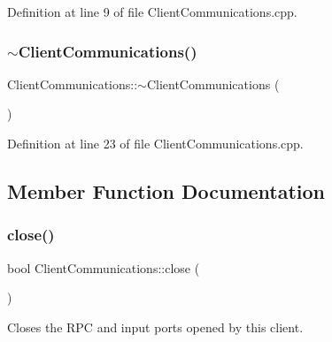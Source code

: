 Definition at line 9 of file Client\+Communications.\+cpp.

\hypertarget{classocra__recipes_1_1ClientCommunications_a20df5cf496f895e9235ad38730962360}{}\label{classocra__recipes_1_1ClientCommunications_a20df5cf496f895e9235ad38730962360} 
\subsubsection{\texorpdfstring{$\sim$\+Client\+Communications()}{~ClientCommunications()}}
{\footnotesize\ttfamily Client\+Communications\+::$\sim$\+Client\+Communications (\begin{DoxyParamCaption}{ }\end{DoxyParamCaption})\hspace{0.3cm}{\ttfamily [virtual]}}



Definition at line 23 of file Client\+Communications.\+cpp.



\subsection{Member Function Documentation}
\hypertarget{classocra__recipes_1_1ClientCommunications_a1ac6b0ebabc5fabdb2bf006ddc48c606}{}\label{classocra__recipes_1_1ClientCommunications_a1ac6b0ebabc5fabdb2bf006ddc48c606} 
\subsubsection{\texorpdfstring{close()}{close()}\hspace{0.1cm}{\footnotesize\ttfamily [1/2]}}
{\footnotesize\ttfamily bool Client\+Communications\+::close (\begin{DoxyParamCaption}{ }\end{DoxyParamCaption})}

Closes the R\+PC and input ports opened by this client.

